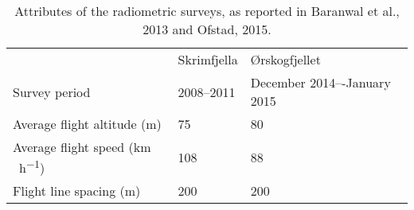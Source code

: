 \begin{table}[tbp]
\caption{Attributes of the radiometric surveys, as reported in Baranwal et al., 2013 and Ofstad, 2015.}
\begin{tabular}{lll}
\hline
                                         & Skrimfjella & Ørskogfjellet               \\ \cline{2-3} 
Survey period                            & 2008--2011  & December 2014–-January 2015 \\
Average flight altitude (m)              & 75          & 80                          \\
Average flight speed (\unit{km\,h^{-1}}) & 108         & 88                          \\
Flight line spacing (m)                  & 200         & 200                         \\ \hline
\end{tabular}
\label{tab:radSurveys}
\end{table}
